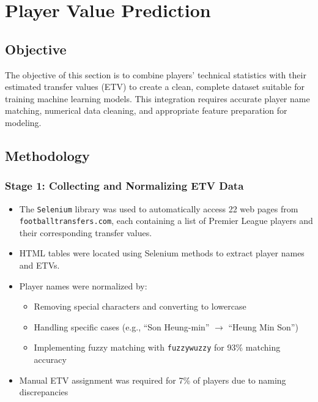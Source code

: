 \documentclass[12pt,a4paper]{article}
\begin{document}
\section{Player Value Prediction}

\subsection{Objective}
The objective of this section is to combine players' technical statistics with their estimated transfer values (ETV) to create a clean, complete dataset suitable for training machine learning models. This integration requires accurate player name matching, numerical data cleaning, and appropriate feature preparation for modeling.

\subsection{Methodology}

\subsubsection{Stage 1: Collecting and Normalizing ETV Data}
\begin{itemize}
    \item The \texttt{Selenium} library was used to automatically access 22 web pages from \texttt{footballtransfers.com}, each containing a list of Premier League players and their corresponding transfer values.
    \item HTML tables were located using Selenium methods to extract player names and ETVs.
    \item Player names were normalized by:
    \begin{itemize}
        \item Removing special characters and converting to lowercase
        \item Handling specific cases (e.g., ``Son Heung-min'' $\rightarrow$ ``Heung Min Son'')
        \item Implementing fuzzy matching with \texttt{fuzzywuzzy} for 93\% matching accuracy
    \end{itemize}
    \item Manual ETV assignment was required for 7\% of players due to naming discrepancies
\end{itemize}
\end{document}
